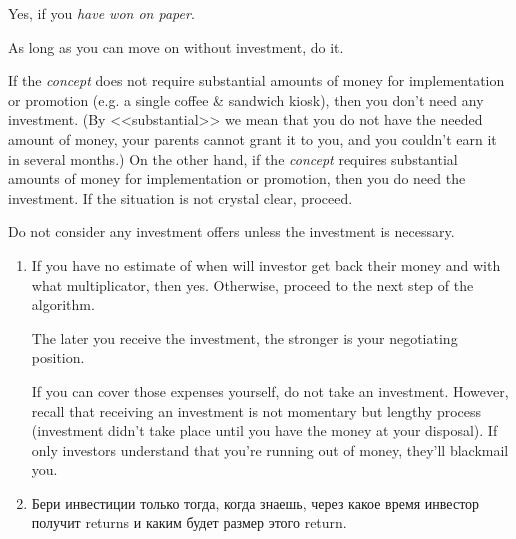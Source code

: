 \documentclass[11pt]{article}
\theoremstyle{remark}
\theoremstyle{definition}
\begin{document}
Yes, if you \textit{have won on paper}.


As long as you can move on without investment, do it.



If the \textit{concept} does not require substantial amounts of money for implementation or promotion (e.g. a single coffee \& sandwich kiosk), then you don't need any investment. (By <<substantial>> we mean that you do not have the needed amount of money, your parents cannot grant it to you, and you couldn't earn it in several months.) On the other hand, if the \textit{concept} requires substantial amounts of money for implementation or promotion, then you do need the investment. If the situation is not crystal clear, proceed. 


Do not consider any investment offers unless the investment is necessary.




\begin{enumerate}

\item If you have no estimate of when will investor get back their money and with what multiplicator, then yes. Otherwise, proceed to the next step of the algorithm.








The later you receive the investment, the stronger is your negotiating position.


If you can cover those expenses yourself, do not take an investment. However, recall that receiving an investment is not momentary but lengthy process (investment didn't take place until you have the money at your disposal). If only investors understand that you're running out of money, they'll blackmail you.


\item Бери инвестиции только тогда, когда знаешь, через какое время инвестор получит returns и каким будет размер этого return.


\end{enumerate}
\end{document}
